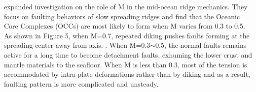 \documentclass[12pt]{article}
\begin{document}
\citet{Tucholke2008} expanded investigation on the role of M in the mid-ocean ridge mechanics. They focus on faulting behaviors of slow spreading ridges and find that the Oceanic Core Complexes (OCCs) are most likely to form when M varies from 0.3 to 0.5. As shown in Figure 5, when M=0.7, repeated diking pushes faults forming at the spreading center away from axis. . When M=0.3$\sim$0.5, the normal faults remains active for a long time to become detachment faults, exhuming the lower crust and mantle materials to the seafloor. When M is less than 0.3, most of the tension is accommodated by intra-plate deformations rather than by diking and as a result, faulting pattern is more complicated and unsteady.
\end{document}
